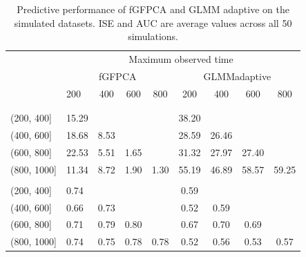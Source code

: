 \documentclass[
  11pt,
]{article}
\begin{document}
\begin{table}

\caption{\label{tab:format table}Predictive performance of fGFPCA and GLMM adaptive on the simulated datasets. ISE and AUC are average values across all 50 simulations.}
\centering
\begin{tabular}[t]{llccccccc}
\toprule
\multicolumn{1}{c}{ } & \multicolumn{8}{c}{Maximum observed time} \\
\cmidrule(l{3pt}r{3pt}){2-9}
\multicolumn{1}{c}{ } & \multicolumn{4}{c}{fGFPCA} & \multicolumn{4}{c}{GLMMadaptive} \\
\cmidrule(l{3pt}r{3pt}){2-5} \cmidrule(l{3pt}r{3pt}){6-9}
  & 200 & 400 & 600 & 800 & 200 & 400 & 600 & 800\\
\midrule
\addlinespace[0.3em]
\multicolumn{9}{l}{\textbf{Prediction time window}}\\
\addlinespace[0.3em]
\multicolumn{9}{l}{\textbf{ISE}}\\
\hspace{1em}\hspace{1em}(200, 400] & 15.29 &  &  &  & 38.20 &  &  & \\
\hspace{1em}\hspace{1em}(400, 600] & 18.68 & 8.53 &  &  & 28.59 & 26.46 &  & \\
\hspace{1em}\hspace{1em}(600, 800] & 22.53 & 5.51 & 1.65 &  & 31.32 & 27.97 & 27.40 & \\
\hspace{1em}\hspace{1em}(800, 1000] & 11.34 & 8.72 & 1.90 & 1.30 & 55.19 & 46.89 & 58.57 & 59.25\\
\addlinespace[0.3em]
\multicolumn{9}{l}{\textbf{AUC}}\\
\hspace{1em}\hspace{1em}(200, 400] & 0.74 &  &  &  & 0.59 &  &  & \\
\hspace{1em}\hspace{1em}(400, 600] & 0.66 & 0.73 &  &  & 0.52 & 0.59 &  & \\
\hspace{1em}\hspace{1em}(600, 800] & 0.71 & 0.79 & 0.80 &  & 0.67 & 0.70 & 0.69 & \\
\hspace{1em}\hspace{1em}(800, 1000] & 0.74 & 0.75 & 0.78 & 0.78 & 0.52 & 0.56 & 0.53 & 0.57\\
\bottomrule
\end{tabular}
\end{table}
\end{document}
